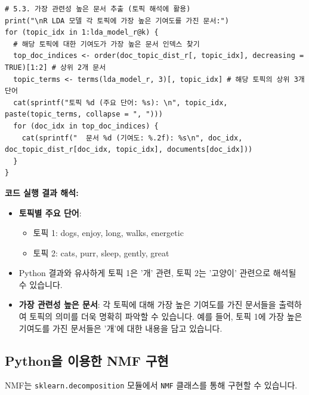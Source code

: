 \documentclass[11pt,a4paper]{article}
\theoremstyle{definition}
\begin{document}
\begin{lstlisting}[caption={R을 이용한 LDA 구현 예시}, label={lst:r_lda}]
# 5.3. 가장 관련성 높은 문서 추출 (토픽 해석에 활용)
print("\nR LDA 모델 각 토픽에 가장 높은 기여도를 가진 문서:")
for (topic_idx in 1:lda_model_r@k) {
  # 해당 토픽에 대한 기여도가 가장 높은 문서 인덱스 찾기
  top_doc_indices <- order(doc_topic_dist_r[, topic_idx], decreasing = TRUE)[1:2] # 상위 2개 문서
  topic_terms <- terms(lda_model_r, 3)[, topic_idx] # 해당 토픽의 상위 3개 단어
  cat(sprintf("토픽 %d (주요 단어: %s): \n", topic_idx, paste(topic_terms, collapse = ", ")))
  for (doc_idx in top_doc_indices) {
    cat(sprintf("  문서 %d (기여도: %.2f): %s\n", doc_idx, doc_topic_dist_r[doc_idx, topic_idx], documents[doc_idx]))
  }
}
\end{lstlisting}

\begin{examplebox}
\textbf{코드 실행 결과 해석:}
\begin{itemize}
    \item \textbf{토픽별 주요 단어}:
    \begin{itemize}
        \item 토픽 1: dogs, enjoy, long, walks, energetic
        \item 토픽 2: cats, purr, sleep, gently, great
    \end{itemize}
    \item Python 결과와 유사하게 토픽 1은 '개' 관련, 토픽 2는 '고양이' 관련으로 해석될 수 있습니다.
    \item \textbf{가장 관련성 높은 문서}: 각 토픽에 대해 가장 높은 기여도를 가진 문서들을 출력하여 토픽의 의미를 더욱 명확히 파악할 수 있습니다. 예를 들어, 토픽 1에 가장 높은 기여도를 가진 문서들은 '개'에 대한 내용을 담고 있습니다.
\end{itemize}
\end{examplebox}

\newpage
\subsection*{Python을 이용한 NMF 구현}
NMF는 \texttt{sklearn.decomposition} 모듈에서 \texttt{NMF} 클래스를 통해 구현할 수 있습니다.
\end{document}
